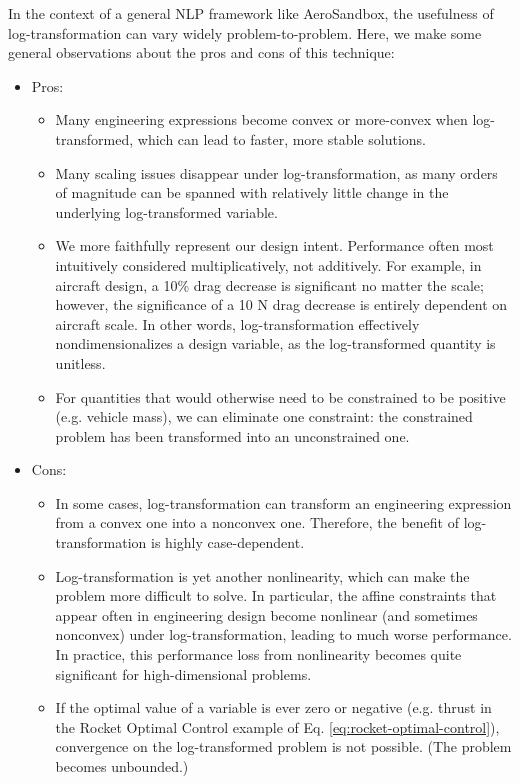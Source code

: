 In the context of a general NLP framework like AeroSandbox, the usefulness of log-transformation can vary widely problem-to-problem. Here, we make some general observations about the pros and cons of this technique:

\begin{itemize}
    \item Pros:
    \begin{itemize}
        \item Many engineering expressions become convex or more-convex when log-transformed, which can lead to faster, more stable solutions.
        \item Many scaling issues disappear under log-transformation, as many orders of magnitude can be spanned with relatively little change in the underlying log-transformed variable.
        \item We more faithfully represent our design intent. Performance often most intuitively considered multiplicatively, not additively. For example, in aircraft design, a 10\% drag decrease is significant no matter the scale; however, the significance of a 10 \si{\newton} drag decrease is entirely dependent on aircraft scale. In other words, log-transformation effectively nondimensionalizes a design variable, as the log-transformed quantity is unitless.
        \item For quantities that would otherwise need to be constrained to be positive (e.g. vehicle mass), we can eliminate one constraint: the constrained problem has been transformed into an unconstrained one.
    \end{itemize}
    \item Cons:
    \begin{itemize}
        \item In some cases, log-transformation can transform an engineering expression from a convex one into a nonconvex one. Therefore, the benefit of log-transformation is highly case-dependent.
        \item Log-transformation is yet another nonlinearity, which can make the problem more difficult to solve. In particular, the affine constraints that appear often in engineering design become nonlinear (and sometimes nonconvex) under log-transformation, leading to much worse performance. In practice, this performance loss from nonlinearity becomes quite significant for high-dimensional problems.
        \item If the optimal value of a variable is ever zero or negative (e.g. thrust in the Rocket Optimal Control example of Eq. \ref{eq:rocket-optimal-control}), convergence on the log-transformed problem is not possible. (The problem becomes unbounded.)
    \end{itemize}
\end{itemize}


